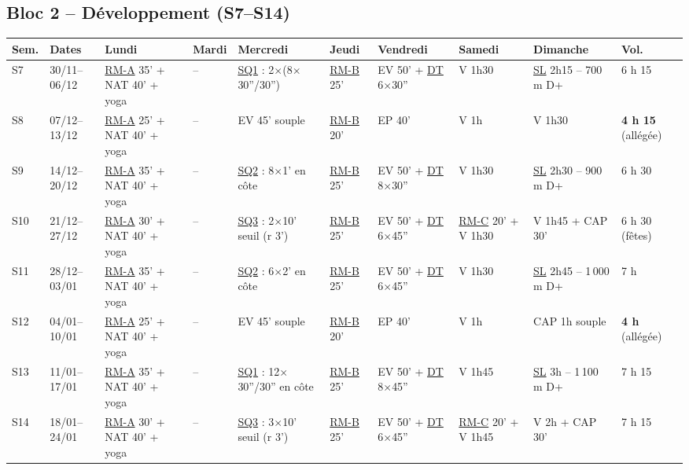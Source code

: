 \documentclass[10pt,a4paper]{article}
\newcommand{\rma}{\hyperlink{rm-a}{RM-A}}
\newcommand{\rmb}{\hyperlink{rm-b}{RM-B}}
\newcommand{\rmc}{\hyperlink{rm-c}{RM-C}}
\newcommand{\sqa}{\hyperlink{sq1}{SQ1}}
\newcommand{\sqb}{\hyperlink{sq2}{SQ2}}
\newcommand{\sqc}{\hyperlink{sq3}{SQ3}}
\newcommand{\dtl}{\hyperlink{dt}{DT}}
\newcommand{\sln}{\hyperlink{legende}{SL}}
\begin{document}
\begin{landscape}
\subsection*{\color{acc} Bloc 2 -- D\'eveloppement (S7--S14)}
\begin{tabular}{p{0.95cm}p{1.5cm}p{2.95cm}p{1.3cm}p{3.7cm}p{1.5cm}p{3.5cm}p{2.2cm}p{3.9cm}p{1.15cm}}
\toprule
\textbf{Sem.} & \textbf{Dates} & \textbf{Lundi} & \textbf{Mardi} & \textbf{Mercredi} & \textbf{Jeudi} & \textbf{Vendredi} & \textbf{Samedi} & \textbf{Dimanche} & \textbf{Vol.}\\
\midrule
S7 & 30/11--06/12 & \rma{} 35' + NAT 40' + yoga & -- & \sqa{} : 2$\times$(8$\times$30''/30'') & \rmb{} 25' & EV 50' + \dtl{} 6$\times$30'' & V 1h30 & \sln{} 2h15 -- 700 m D+ & 6 h 15\\
S8 & 07/12--13/12 & \rma{} 25' + NAT 40' + yoga & -- & EV 45' souple & \rmb{} 20' & EP 40' & V 1h & V 1h30 & \textbf{4 h 15} (all\'eg\'ee)\\
S9 & 14/12--20/12 & \rma{} 35' + NAT 40' + yoga & -- & \sqb{} : 8$\times$1' en c\^ote & \rmb{} 25' & EV 50' + \dtl{} 8$\times$30'' & V 1h30 & \sln{} 2h30 -- 900 m D+ & 6 h 30\\
S10 & 21/12--27/12 & \rma{} 30' + NAT 40' + yoga & -- & \sqc{} : 2$\times$10' seuil (r 3') & \rmb{} 25' & EV 50' + \dtl{} 6$\times$45'' & \rmc{} 20' + V 1h30 & V 1h45 + CAP 30' & 6 h 30 (f\^etes)\\
S11 & 28/12--03/01 & \rma{} 35' + NAT 40' + yoga & -- & \sqb{} : 6$\times$2' en c\^ote & \rmb{} 25' & EV 50' + \dtl{} 6$\times$45'' & V 1h30 & \sln{} 2h45 -- 1\,000 m D+ & 7 h\\
S12 & 04/01--10/01 & \rma{} 25' + NAT 40' + yoga & -- & EV 45' souple & \rmb{} 20' & EP 40' & V 1h & CAP 1h souple & \textbf{4 h} (all\'eg\'ee)\\
S13 & 11/01--17/01 & \rma{} 35' + NAT 40' + yoga & -- & \sqa{} : 12$\times$30''/30'' en c\^ote & \rmb{} 25' & EV 50' + \dtl{} 8$\times$45'' & V 1h45 & \sln{} 3h -- 1\,100 m D+ & 7 h 15\\
S14 & 18/01--24/01 & \rma{} 30' + NAT 40' + yoga & -- & \sqc{} : 3$\times$10' seuil (r 3') & \rmb{} 25' & EV 50' + \dtl{} 6$\times$45'' & \rmc{} 20' + V 1h45 & V 2h + CAP 30' & 7 h 15\\
\bottomrule
\end{tabular}
\medskip


\end{landscape}
\end{document}
